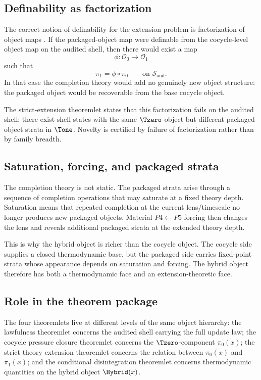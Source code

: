 \subsection{Definability as factorization}

The correct notion of definability for the extension problem is factorization of object maps \cite{LindMarcus1995SymbolicDynamics,Walters1986RelativePressure}. If the packaged-object map were definable from the cocycle-level object map on the audited shell, then there would exist a map
\[
\phi:\mathcal{O}_0\to \mathcal{O}_1
\]
such that
\[
\pi_1=\phi\circ\pi_0
\qquad\text{on }\mathcal{S}_{\mathrm{aud}}.
\]
In that case the completion theory would add no genuinely new object structure: the packaged object would be recoverable from the base cocycle object.

The strict-extension theoremlet states that this factorization fails on the audited shell: there exist shell states with the same \(\Tzero\)-object but different packaged-object strata in \(\Tone\). Novelty is certified by failure of factorization rather than by family breadth.

\subsection{Saturation, forcing, and packaged strata}

The completion theory is not static. The packaged strata arise through a sequence of completion operations that may saturate at a fixed theory depth. Saturation means that repeated completion at the current lens/timescale no longer produces new packaged objects. Material \(P4\leftarrow P5\) forcing then changes the lens and reveals additional packaged strata at the extended theory depth.

This is why the hybrid object is richer than the cocycle object. The cocycle side supplies a closed thermodynamic base, but the packaged side carries fixed-point strata whose appearance depends on saturation and forcing. The hybrid object therefore has both a thermodynamic face and an extension-theoretic face.

\subsection{Role in the theorem package}

The four theoremlets live at different levels of the same object hierarchy: the lawfulness theoremlet concerns the audited shell carrying the full update law; the cocycle pressure closure theoremlet concerns the \(\Tzero\)-component \(\pi_0(x)\); the strict theory extension theoremlet concerns the relation between \(\pi_0(x)\) and \(\pi_1(x)\); and the conditional disintegration theoremlet concerns thermodynamic quantities on the hybrid object \(\Hybrid(x)\).
